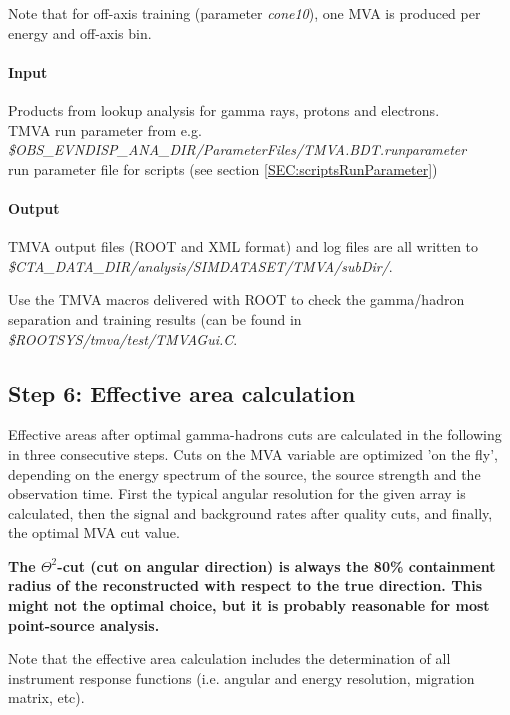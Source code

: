 \documentclass[titlepage,a4paper,twoside,11pt]{report}
\begin{document}
Note that for off-axis training (parameter {\it cone10}), one MVA is produced per energy and off-axis bin.

\paragraph{Input}
Products from lookup analysis for gamma rays, protons and electrons. \\
TMVA run parameter from e.g. \\
{\it \$OBS\_EVNDISP\_ANA\_DIR/ParameterFiles/TMVA.BDT.runparameter} \\
run parameter file for scripts (see section \ref{SEC:scriptsRunParameter})

\paragraph{Output}

TMVA output files (ROOT and XML format) and log files are all written to \\
{\it \$CTA\_DATA\_DIR/analysis/SIMDATASET/TMVA/subDir/}.

Use the TMVA macros delivered with ROOT to check the gamma/hadron separation and training results (can be found in {\it \$ROOTSYS/tmva/test/TMVAGui.C}.


\subsection{Step 6: Effective area calculation}

Effective areas after optimal gamma-hadrons cuts are calculated in the following in three consecutive steps.
Cuts on the MVA variable are optimized 'on the fly', 
depending on the energy spectrum of the source, the source strength and the observation time.
First the typical angular resolution for the given array is calculated, then the signal and background 
rates after quality cuts, and finally, the optimal MVA cut value.

{\bf The $\Theta^2$-cut (cut on angular direction) is always the 80\% containment radius of the reconstructed with respect to the true direction. This might not the optimal choice, but it is probably reasonable for most point-source analysis.}

Note that the effective area calculation includes the determination of all instrument response functions (i.e. angular and energy resolution, migration matrix, etc).
\end{document}
